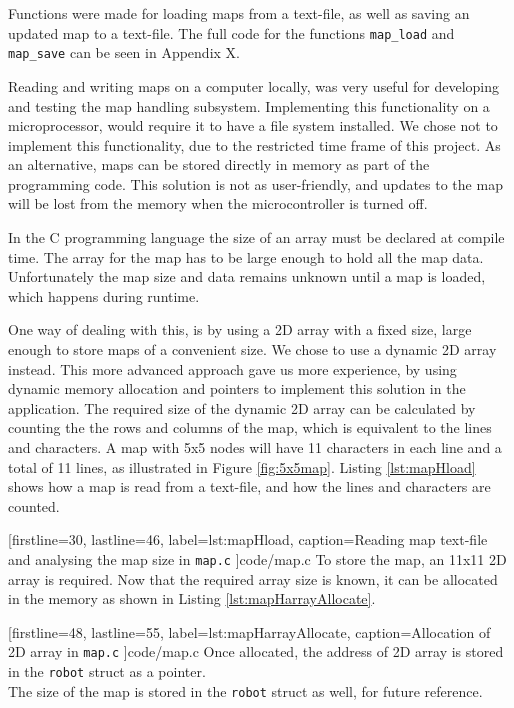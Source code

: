 Functions were made for loading maps from a text-file, as well as saving an updated map to a text-file. 
The full code for the functions {\tt map\_load} and {\tt map\_save} can be seen in Appendix X.

Reading and writing maps on a computer locally, was very useful for developing and testing the map handling subsystem. 
Implementing this functionality on a microprocessor, would require it to have a file system installed.
We chose not to implement this functionality, due to the restricted time frame of this project.
As an alternative, maps can be stored directly in memory as part of the programming code. 
This solution is not as user-friendly, and updates to the map will be lost from the memory when the microcontroller is turned off.

In the C programming language the size of an array must be declared at compile time. 
The array for the map has to be large enough to hold all the map data.
Unfortunately the map size and data remains unknown until a map is loaded, which happens during runtime.

One way of dealing with this, is by using a 2D array with a fixed size, large enough to store maps of a convenient size. 
We chose to use a dynamic 2D array instead. 
This more advanced approach gave us more experience, by using dynamic memory allocation and pointers to implement this solution in the application.
\newpage
The required size of the dynamic 2D array can be calculated by counting the the rows and columns of the map,
which is equivalent to the lines and characters.
A map with 5x5 nodes will have 11 characters in each line and a total of 11 lines,
as illustrated in Figure \ref{fig:5x5map}. Listing \ref{lst:mapHload} shows how a map is read from a text-file, and how the lines and characters are counted.


[firstline=30,			%
lastline=46,			%
label=lst:mapHload,		%
caption={Reading map text-file and analysing the map size in {\tt map.c}}
]{code/map.c}
To store the map, an 11x11 2D array is required.
Now that the required array size is known, it can be allocated in the memory as shown in Listing \ref{lst:mapHarrayAllocate}.


[firstline=48,			%
lastline=55,			%
label=lst:mapHarrayAllocate,	%
caption={Allocation of 2D array in {\tt map.c}}
]{code/map.c}
Once allocated, the address of 2D array is stored in the {\tt robot} struct as a pointer.\\
The size of the map is stored in the {\tt robot} struct as well, for future reference.


